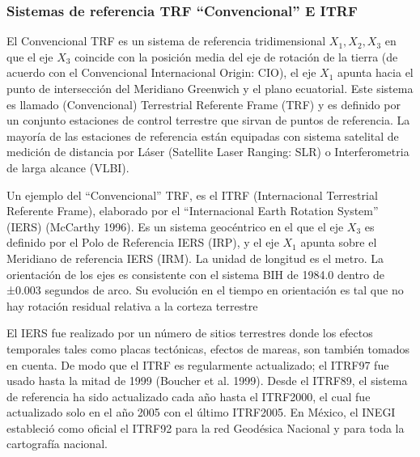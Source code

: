 \subsubsection{Sistemas de referencia TRF ``Convencional'' E ITRF}
El Convencional TRF es un sistema de referencia tridimensional $X_1, X_2, X_3$ en que el eje $X_3$ coincide con la posición media del eje de rotación de la tierra (de acuerdo con el Convencional Internacional Origin: CIO), el eje $X_1$ apunta hacia el punto de intersección del Meridiano Greenwich y el plano ecuatorial. Este sistema es llamado (Convencional) Terrestrial Referente Frame (TRF) y es definido por un conjunto estaciones de control terrestre que sirvan de puntos de referencia. La mayoría de las  estaciones de referencia están equipadas con sistema satelital de medición de distancia por Láser (Satellite Laser Ranging: SLR) o Interferometria de larga alcance (VLBI). 

Un ejemplo del ``Convencional'' TRF, es el ITRF (Internacional Terrestrial Referente Frame), elaborado por el ``Internacional Earth Rotation System'' (IERS) (McCarthy 1996). Es un sistema geocéntrico en el que el eje $X_3$ es definido por el Polo de Referencia IERS (IRP), y el eje $X_1$ apunta sobre el Meridiano de referencia IERS (IRM). La unidad de longitud es el metro. La orientación de los ejes es consistente con el sistema BIH de 1984.0 dentro de ±0.003 segundos de arco. Su evolución en el tiempo en orientación es tal que no hay rotación residual relativa a la corteza terrestre

El IERS fue realizado por un número de sitios terrestres donde los efectos temporales tales como placas tectónicas, efectos de mareas, son también tomados en cuenta. De modo que el ITRF es regularmente actualizado; el ITRF97 fue usado hasta la mitad de 1999 (Boucher et al. 1999).  Desde el ITRF89, el sistema de referencia ha sido actualizado cada año hasta  el ITRF2000, el cual fue actualizado solo en el año 2005 con el último ITRF2005. En México, el INEGI estableció como oficial el ITRF92 para la red Geodésica Nacional y para toda la cartografía nacional.

